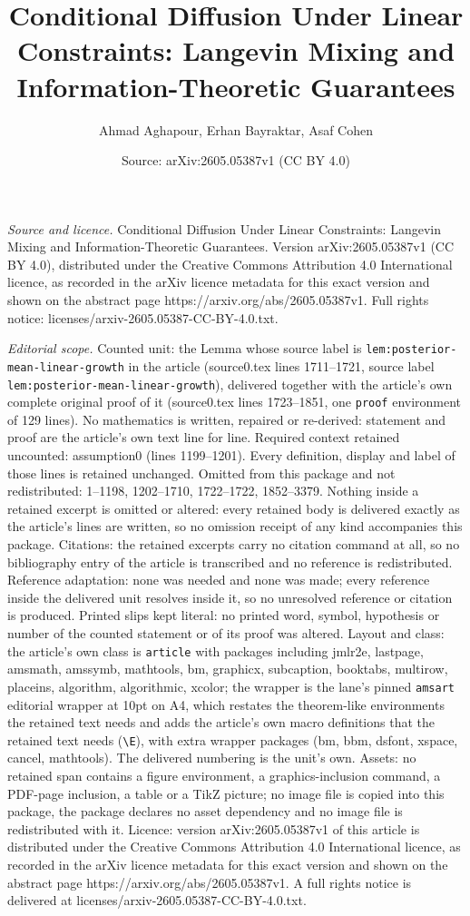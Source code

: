 \documentclass[10pt,a4paper]{amsart}
\title[Conditional Diffusion Under Linear Constraints: Langevin Mix]{Conditional Diffusion Under Linear Constraints: Langevin Mixing and Information-Theoretic Guarantees}
\author{Ahmad Aghapour, Erhan Bayraktar, Asaf Cohen}
\date{Source: arXiv:2605.05387v1 (CC BY 4.0)}
\begin{document}
\maketitle

\noindent\emph{Source and licence.} Conditional Diffusion Under Linear Constraints: Langevin Mixing and Information-Theoretic Guarantees. Version arXiv:2605.05387v1 (CC BY 4.0), distributed under the Creative Commons Attribution 4.0 International licence, as recorded in the arXiv licence metadata for this exact version and shown on the abstract page https://arxiv.org/abs/2605.05387v1. Full rights notice: licenses/arxiv-2605.05387-CC-BY-4.0.txt.\par\smallskip

\noindent\textit{Editorial scope.} Counted unit: the Lemma whose source label is \texttt{lem:posterior-mean-linear-growth} in the article (source0.tex lines 1711--1721, source label \texttt{lem:posterior-mean-linear-growth}), delivered together with the article's own complete original proof of it (source0.tex lines 1723--1851, one \texttt{proof} environment of 129 lines). No mathematics is written, repaired or re-derived: statement and proof are the article's own text line for line. Required context retained uncounted: assumption0 (lines 1199--1201). Every definition, display and label of those lines is retained unchanged. Omitted from this package and not redistributed: 1--1198, 1202--1710, 1722--1722, 1852--3379. Nothing inside a retained excerpt is omitted or altered: every retained body is delivered exactly as the article's lines are written, so no omission receipt of any kind accompanies this package. Citations: the retained excerpts carry no citation command at all, so no bibliography entry of the article is transcribed and no reference is redistributed. Reference adaptation: none was needed and none was made; every reference inside the delivered unit resolves inside it, so no unresolved reference or citation is produced. Printed slips kept literal: no printed word, symbol, hypothesis or number of the counted statement or of its proof was altered. Layout and class: the article's own class is \texttt{article} with packages including jmlr2e, lastpage, amsmath, amssymb, mathtools, bm, graphicx, subcaption, booktabs, multirow, placeins, algorithm, algorithmic, xcolor; the wrapper is the lane's pinned \texttt{amsart} editorial wrapper at 10pt on A4, which restates the theorem-like environments the retained text needs and adds the article's own macro definitions that the retained text needs (\texttt{\textbackslash E}), with extra wrapper packages (bm, bbm, dsfont, xspace, cancel, mathtools). The delivered numbering is the unit's own. Assets: no retained span contains a figure environment, a graphics-inclusion command, a PDF-page inclusion, a table or a TikZ picture; no image file is copied into this package, the package declares no asset dependency and no image file is redistributed with it. Licence: version arXiv:2605.05387v1 of this article is distributed under the Creative Commons Attribution 4.0 International licence, as recorded in the arXiv licence metadata for this exact version and shown on the abstract page https://arxiv.org/abs/2605.05387v1. A full rights notice is delivered at licenses/arxiv-2605.05387-CC-BY-4.0.txt. 
\end{document}
